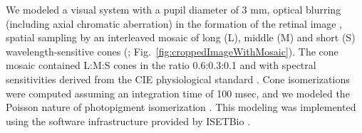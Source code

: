 \documentclass{jov}
\begin{document}
We modeled a visual system with a pupil diameter of 3 mm, optical blurring (including axial chromatic aberration) in the formation of the retinal image \cite{marimont1994matching}, spatial sampling by an interleaved mosaic of long (L), middle (M)  and short (S) wavelength-sensitive cones (; Fig.~\ref{fig:croppedImageWithMosaic}). 
The cone mosaic contained L:M:S cones in the ratio 0.6:0.3:0.1 and with spectral sensitivities derived from the CIE physiological standard \cite{CIE86}.
Cone isomerizations were computed assuming an integration time of 100 msec, and we modeled the Poisson nature of photopigment isomerization \cite{hecht1942energy}. 
This modeling was implemented using the software infrastructure provided by ISETBio \cite{brainard2015isetbio}.

%

%

%

%
%

%
%
%
\end{document}
